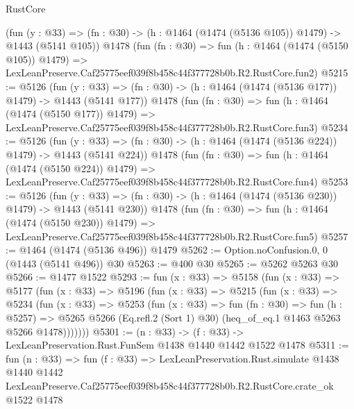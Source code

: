 \begin{lexlean}{RustCore}
\begin{coremodule}
    (fun (y : @33) => (fn : @30) -> (h : @1464 (@1474 (@5136 @105)) @1479) -> @1443 (@5141 @105))
    @1478
    (fun (fn : @30) =>
    fun (h : @1464 (@1474 (@5150 @105)) @1479) =>
    LexLeanPreserve.Caf25775eef039f8b458c44f377728b0b.R2.RustCore.fun2)
@5215 := @5126
    (fun (y : @33) => (fn : @30) -> (h : @1464 (@1474 (@5136 @177)) @1479) -> @1443 (@5141 @177))
    @1478
    (fun (fn : @30) =>
    fun (h : @1464 (@1474 (@5150 @177)) @1479) =>
    LexLeanPreserve.Caf25775eef039f8b458c44f377728b0b.R2.RustCore.fun3)
@5234 := @5126
    (fun (y : @33) => (fn : @30) -> (h : @1464 (@1474 (@5136 @224)) @1479) -> @1443 (@5141 @224))
    @1478
    (fun (fn : @30) =>
    fun (h : @1464 (@1474 (@5150 @224)) @1479) =>
    LexLeanPreserve.Caf25775eef039f8b458c44f377728b0b.R2.RustCore.fun4)
@5253 := @5126
    (fun (y : @33) => (fn : @30) -> (h : @1464 (@1474 (@5136 @230)) @1479) -> @1443 (@5141 @230))
    @1478
    (fun (fn : @30) =>
    fun (h : @1464 (@1474 (@5150 @230)) @1479) =>
    LexLeanPreserve.Caf25775eef039f8b458c44f377728b0b.R2.RustCore.fun5)
@5257 := @1464 (@1474 (@5136 @496)) @1479
@5262 := Option.noConfusion.{0, 0} (@1443 (@5141 @496)) @30
@5263 := @400 @30
@5265 := @5262 @5263 @30
@5266 := @1477 @1522
@5293 := fun (x : @33) =>
  @5158
    (fun (x : @33) =>
    @5177
      (fun (x : @33) =>
      @5196
        (fun (x : @33) =>
        @5215
          (fun (x : @33) =>
          @5234
            (fun (x : @33) =>
            @5253
              (fun (x : @33) =>
              fun (fn : @30) =>
              fun (h : @5257) =>
              @5265 @5266 (Eq.refl.{2} (Sort 1) @30) (heq_of_eq.{1} @1463 @5263 @5266 @1478)))))))
@5301 := (n : @33) -> (f : @33) -> LexLeanPreservation.Rust.FunSem @1438 @1440 @1442 @1522 @1478
@5311 := fun (n : @33) =>
  fun (f : @33) =>
  LexLeanPreservation.Rust.simulate
    @1438
    @1440
    @1442
    LexLeanPreserve.Caf25775eef039f8b458c44f377728b0b.R2.RustCore.crate_ok
    @1522
    @1478
\end{coremodule}
\end{lexlean}
